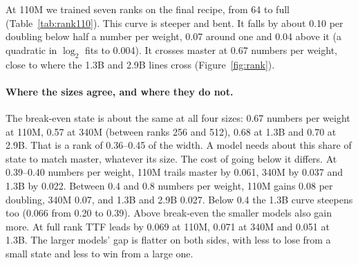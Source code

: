 \documentclass[10pt,twocolumn]{article}
\begin{document}
\begin{table}[t]
\caption{110M rank sweep on the final recipe (fixed windows, Wikipedia; master + extras 2.7166, two seeds).}
\label{tab:rank110}
\end{table}

At 110M we trained seven ranks on the final recipe, from 64 to full (Table~\ref{tab:rank110}). This curve is steeper
and bent. It falls by about 0.10 per doubling below half a number per weight, 0.07 around one and 0.04 above it (a
quadratic in $\log_2$ fits to 0.004). It crosses master at 0.67 numbers per weight, close to where the 1.3B and 2.9B
lines cross (Figure~\ref{fig:rank}).

\paragraph{Where the sizes agree, and where they do not.} The break-even state is about the same at all four sizes: 0.67
numbers per weight at 110M, 0.57 at 340M (between ranks 256 and 512), 0.68 at 1.3B and 0.70 at 2.9B. That is a rank of
0.36--0.45 of the width. A model needs about this share of state to match master, whatever its size. The cost of going
below it differs. At 0.39--0.40 numbers per weight, 110M trails master by 0.061, 340M by 0.037 and 1.3B by 0.022.
Between 0.4 and 0.8 numbers per weight, 110M gains 0.08 per doubling, 340M 0.07, and 1.3B and 2.9B 0.027. Below 0.4 the
1.3B curve steepens too (0.066 from 0.20 to 0.39). Above break-even the smaller models also gain more. At full rank TTF
leads by 0.069 at 110M, 0.071 at 340M and 0.051 at 1.3B. The larger models' gap is flatter on both sides, with less to
lose from a small state and less to win from a large one.
\end{document}

